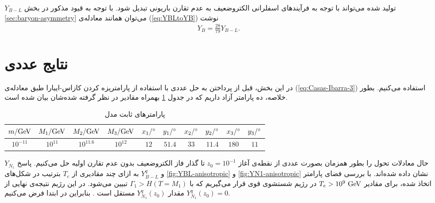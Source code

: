 \documentclass[a4paper]{book}
\begin{document}
{\footnotesize$Y_{B-L}$} تولید شده می‌تواند با توجه به فرآیندهای اسفلرانی الکتروضعیف به عدم تقارن باریونی تبدیل شود. با توجه به قیود مذکور در بخش \ref{sec:baryon-asymmetry} می‌توان همانند معادله‌ی (\ref{eq:YBLtoYB}) نوشت
{\footnotesize\begin{align}
	Y_{B} = \frac{28}{79} Y_{B-L}.
	\label{eq:YBLtoB-anisotropic}
\end{align}}

\section{نتایج عددی}
\label{sec:results-anisotropic}
در این بخش، قبل از پرداختن به حل عددی با استفاده از پارامتریزه کردن کازاس-ایبارا طبق معادله‌ی (\ref{eq:Casas-Ibarra-3}) استفاده می‌کنیم. بطور خلاصه، ده پارامتر آزاد داریم که در جدول \ref{tab:parameters-anisotropic} بهمراه مقادیر در نظر گرفته شده‌شان بیان شده است.
\begin{table}[!h]
	\centering
	\caption{پارامتر‌های ثابت مدل}
	\begin{latin}
		\footnotesize
		\begin{tabular}{c c c c c c c c c c}
			\hline
			$m/{\rm GeV}$ & $M_1/{\rm GeV}$ & $M_2/{\rm GeV}$	& $M_3/{\rm GeV}$ & $x_1/\degree$ & $y_1/\degree$ & $x_2/\degree$ & $y_2/\degree$ & $x_3/\degree$ &   $y_3/\degree$ \\
			\hline
			$10^{-11}$	& $10^{11}$ & $10^{11.6}$& $10^{12}$ & $12$ & $51.4$ & $33$ & $11.4$ & $180$ & $11$\\
			\hline
		\end{tabular}
	\end{latin}
	\label{tab:parameters-anisotropic}
\end{table}

حال معادلات تحول را بطور همزمان بصورت عددی از نقطه‌ی آغاز {\footnotesize$z_0=10^{-1}$} تا گذار فاز الکتروضعیف بدون عدم تقارن اولیه حل می‌کنیم. پاسخ {\footnotesize$Y_{N_1}$} و {\footnotesize$Y_{B-L}^q$} به ازای چند مقادیری از {\footnotesize$T_e$} بترتیب در شکل‌های \ref{fig:YBL-anisotropic} و \ref{fig:YN1-anisotropic} نشان داده شده‌اند.
با بررسی فضای پارامتر اتخاذ شده، برای مقادیر {\footnotesize$T_e>10^9\ {\rm GeV}$} در رژیم شستشوی قوی قرار می‌گیریم که با {\footnotesize$\Gamma_1 > H(T = M_1)$} تبیین می‌شود. در این رژیم نتیجه‌ی نهایی از مقدار {\footnotesize$Y^q_{N_1}(z_0)$} مستقل است \cite{Buchmuller:2004nz}. بنابراین در ابتدا فرض می‌کنیم {\footnotesize$Y_{N_1}^q(z_0)=0$}.
\end{document}
